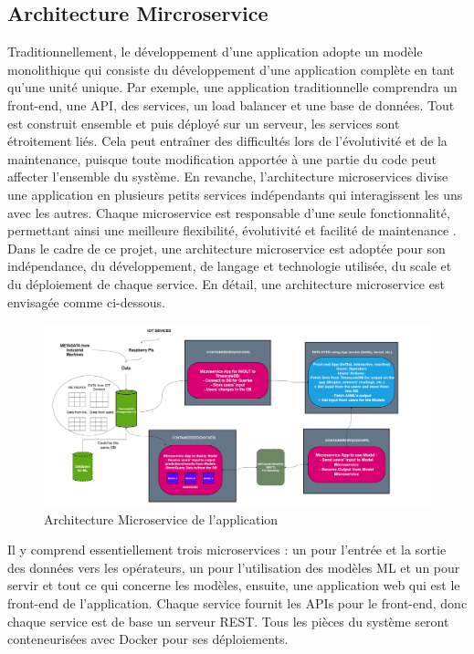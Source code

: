 \documentclass{template}
\begin{document}
\subsection{Architecture Mircroservice}
Traditionnellement, le développement d'une application adopte un modèle monolithique qui consiste du développement d'une application complète en tant qu'une unité unique. Par exemple, une application traditionnelle comprendra un front-end, une API, des services, un load balancer et une base de données. Tout est construit ensemble et puis déployé sur un serveur, les services sont étroitement liés. Cela peut entraîner des difficultés lors de l'évolutivité et de la maintenance, puisque toute modification apportée à une partie du code peut affecter l'ensemble du système. En revanche, l'architecture microservices divise une application en plusieurs petits services indépendants qui interagissent les uns avec les autres. Chaque microservice est responsable d'une seule fonctionnalité, permettant ainsi une meilleure flexibilité, évolutivité et facilité de maintenance \cite{atlassianMicroservicesArchitecture} \cite{mediumArchitectureComparison}. Dans le cadre de ce projet, une architecture microservice est adoptée pour son indépendance, du développement, de langage et technologie utilisée, du scale et du déploiement de chaque service. En détail, une architecture microservice est envisagée comme ci-dessous.
\begin{figure}[h!]
    \includegraphics[scale=0.23]{Pics/SystemDesign.png}
    \centering
    \caption{Architecture Microservice de l'application}
    \label{fig:sys_des}
\end{figure}

Il y comprend essentiellement trois microservices : un pour l'entrée et la sortie des données vers les opérateurs, un pour l'utilisation des modèles ML et un pour servir et tout ce qui concerne les modèles, ensuite, une application web qui est le front-end de l'application. Chaque service fournit les APIs pour le front-end, donc chaque service est de base un serveur REST. Tous les pièces du système seront conteneurisées avec Docker pour ses déploiements.
\end{document}
